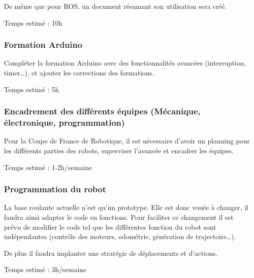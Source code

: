 \documentclass[12pt,a4paper]{article}
\begin{document}
De même que pour ROS, un document résumant son utilisation sera créé.

Temps estimé : 10h

\subsubsection*{Formation Arduino}
Compléter la formation Arduino avec des fonctionnalités avancées (interruption, timer…), et ajouter les corrections des formations.

Temps estimé : 5h

\subsubsection*{Encadrement des différents équipes (Mécanique, électronique, programmation)}
Pour la Coupe de France de Robotique, il est nécessaire d'avoir un planning pour les différents parties des robots, superviser l'avancée et encadrer les équipes.

Temps estimé : 1-2h/semaine

\subsubsection*{Programmation du robot}
La base roulante actuelle n'est qu'un prototype. Elle est donc vouée à changer, il faudra ainsi adapter le code en fonctions. Pour faciliter ce changement il est prévu de modifier le code tel que les différentes fonction du robot sont indépendantes (contrôle des moteurs, odométrie, génération de trajectoire…).

De plus il faudra implanter une stratégie de déplacements et d'actions.

Temps estimé : 3h/semaine
\end{document}
